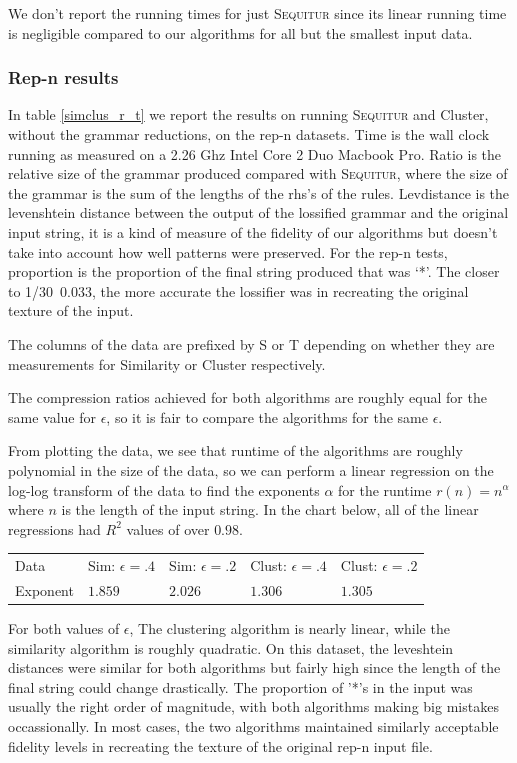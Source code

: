 \documentclass[11pt]{article}
\newcommand{\Sequitur}{\textsc{Sequitur}\xspace}
\begin{document}
We don't report the running times for just \Sequitur since its linear running
time is negligible compared to our algorithms for all but the smallest input
data.

\subsubsection{Rep-n results}

In table \ref{simclus_r_t} we report the results on running \Sequitur and
Cluster, without the grammar reductions, on the rep-n datasets. Time is the
wall clock running as measured on a 2.26 Ghz Intel Core 2 Duo Macbook Pro.
Ratio is the relative size of the grammar produced compared with \Sequitur,
where the size of the grammar is the sum of the lengths of the rhs's of the
rules. Levdistance is the levenshtein distance between the output of the
lossified grammar and the original input string, it is a kind of measure of the
fidelity of our algorithms but doesn't take into account how well patterns were
preserved. For the rep-n tests, proportion is the proportion of the final
string produced that was `*'. The closer to 1/30~0.033, the more accurate the
lossifier was in recreating the original texture of the input.

The columns of the data are prefixed by S or T depending on whether they are
measurements for Similarity or Cluster respectively.

The compression ratios achieved for both algorithms are roughly equal for the
same value for $\epsilon$, so it is fair to compare the algorithms for the same
$\epsilon$.

From plotting the data, we see that runtime of the algorithms are roughly
polynomial in the size of the data, so we can perform a linear regression on
the log-log transform of the data to find the exponents $\alpha$ for the
runtime $r(n)=n^\alpha$ where $n$ is the length of the input string. In the
chart below, all of the linear regressions had $R^2$ values of over $0.98$.

\begin{tabular}{l|l|l|l|l}
Data     & Sim: $\epsilon=.4$ & Sim: $\epsilon=.2$ & Clust: $\epsilon = .4$ & Clust: $\epsilon = .2$ \\
Exponent & $1.859$ & $2.026$ & $1.306$ & $1.305$
\end{tabular}

For both values of $\epsilon$, The clustering algorithm is nearly linear, while
the similarity algorithm is roughly quadratic. On this dataset, the leveshtein
distances were similar for both algorithms but fairly high since the length of
the final string could change drastically.  The proportion of '*'s in the input
was usually the right order of magnitude, with both algorithms making big
mistakes occassionally. In most cases, the two algorithms maintained similarly
acceptable fidelity levels in recreating the texture of the original rep-n
input file.
\end{document}
